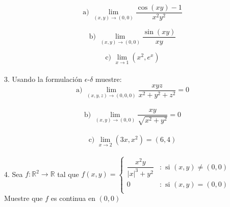 \documentclass[letterpaper]{article}
\renewcommand{\*}{\cdot}
\theoremstyle{definition}
\begin{document}
$$\text{a) }\displaystyle\lim_{(x,y) \to (0,0)} \dfrac{\cos(xy) - 1}{x^2y^2}$$

$$\text{b) }\displaystyle\lim_{(x,y) \to (0,0)} \dfrac{\sin(xy) }{xy}$$

$$\text{c) }\displaystyle\lim_{x \to 1} (x^2 , e^x) $$\\[0.5cm]
3.  Usando la formulación $\epsilon$-$\delta$ muestre: \\

 $$ \text{a) } \displaystyle\lim_{(x,y,z) \to (0,0,0)} \dfrac{xyz}{x^2 + y^2 + z^2} = 0$$\\

$$\text{b) }\displaystyle\lim_{(x,y) \to (0,0)} \dfrac{xy }{\sqrt{x^2 + y^2}} = 0$$\\

$$\text{c) }\displaystyle\lim_{x \to 2} (3x , x^2) = (6,4) $$\\[0.5cm]
4.  Sea $f: \mathbb{R}^2  \longrightarrow \mathbb{R}$ tal que $f(x,y) = \left\{
     \begin{array}{cl}
       \dfrac{x^2y}{\vert x \vert^3 + y^2} & : \text{ si } (x,y) \neq (0,0)\\
       0 & : \text{ si } (x,y) = (0,0)\\
     \end{array}
   \right.$ \\Muestre que $f$ es continua en $(0,0)$
\end{document}
